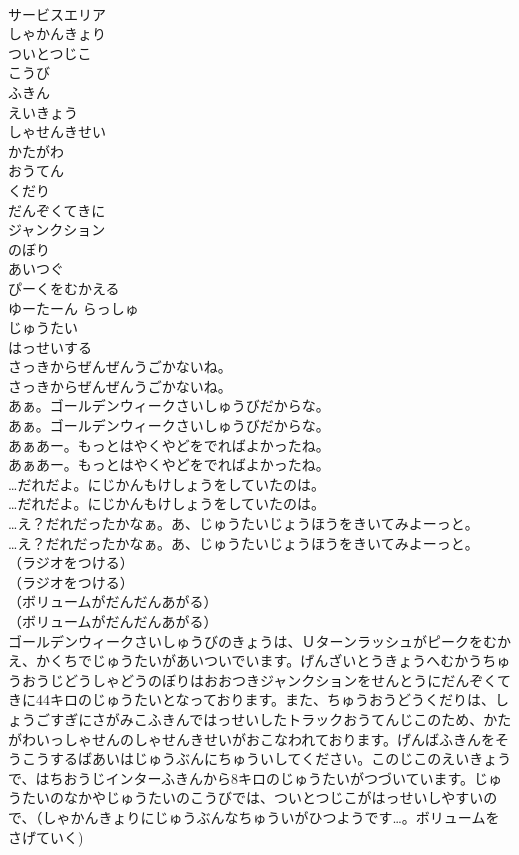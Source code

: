 \documentclass[8pt]{extreport}
\begin{document}
\begin{CJK}{UTF8}{min}
\\	サービスエリア
\\	しゃかんきょり
\\	ついとつじこ
\\	こうび
\\	ふきん
\\	えいきょう
\\	しゃせんきせい
\\	かたがわ
\\	おうてん
\\	くだり
\\	だんぞくてきに
\\	ジャンクション
\\	のぼり
\\	あいつぐ
\\	ぴーくをむかえる
\\	ゆーたーん らっしゅ
\\	じゅうたい
\\	はっせいする
\\	さっきからぜんぜんうごかないね。	
\\	さっきからぜんぜんうごかないね。 
\\	あぁ。ゴールデンウィークさいしゅうびだからな。	
\\	あぁ。ゴールデンウィークさいしゅうびだからな。 
\\	あぁあー。もっとはやくやどをでればよかったね。	
\\	あぁあー。もっとはやくやどをでればよかったね。 
\\	…だれだよ。にじかんもけしょうをしていたのは。	
\\	…だれだよ。にじかんもけしょうをしていたのは。 
\\	…え？だれだったかなぁ。あ、じゅうたいじょうほうをきいてみよーっと。	
\\	…え？だれだったかなぁ。あ、じゅうたいじょうほうをきいてみよーっと。 
\\	（ラジオをつける）	
\\	（ラジオをつける） 
\\	（ボリュームがだんだんあがる）	
\\	（ボリュームがだんだんあがる） 
\\	ゴールデンウィークさいしゅうびのきょうは、Ｕターンラッシュがピークをむかえ、かくちでじゅうたいがあいついでいます。げんざいとうきょうへむかうちゅうおうじどうしゃどうのぼりはおおつきジャンクションをせんとうにだんぞくてきに44キロのじゅうたいとなっております。また、ちゅうおうどうくだりは、しょうごすぎにさがみこふきんではっせいしたトラックおうてんじこのため、かたがわいっしゃせんのしゃせんきせいがおこなわれております。げんばふきんをそうこうするばあいはじゅうぶんにちゅういしてください。このじこのえいきょうで、はちおうじインターふきんから8キロのじゅうたいがつづいています。じゅうたいのなかやじゅうたいのこうびでは、ついとつじこがはっせいしやすいので、（しゃかんきょりにじゅうぶんなちゅういがひつようです…。ボリュームをさげていく)	

\end{CJK}
\end{document}
